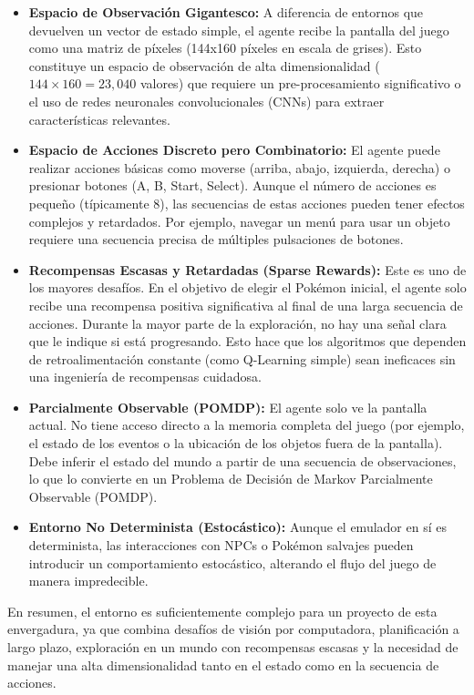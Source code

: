 \documentclass[12pt, oneside, openany]{book}
\begin{document}
\begin{itemize}
    \item \textbf{Espacio de Observación Gigantesco:} A diferencia de entornos que devuelven un vector de estado simple, el agente recibe la pantalla del juego como una matriz de píxeles (144x160 píxeles en escala de grises). Esto constituye un espacio de observación de alta dimensionalidad ($144 \times 160 = 23,040$ valores) que requiere un pre-procesamiento significativo o el uso de redes neuronales convolucionales (CNNs) para extraer características relevantes.
    \item \textbf{Espacio de Acciones Discreto pero Combinatorio:} El agente puede realizar acciones básicas como moverse (arriba, abajo, izquierda, derecha) o presionar botones (A, B, Start, Select). Aunque el número de acciones es pequeño (típicamente 8), las secuencias de estas acciones pueden tener efectos complejos y retardados. Por ejemplo, navegar un menú para usar un objeto requiere una secuencia precisa de múltiples pulsaciones de botones.
    \item \textbf{Recompensas Escasas y Retardadas (Sparse Rewards):} Este es uno de los mayores desafíos. En el objetivo de elegir el Pokémon inicial, el agente solo recibe una recompensa positiva significativa al final de una larga secuencia de acciones. Durante la mayor parte de la exploración, no hay una señal clara que le indique si está progresando. Esto hace que los algoritmos que dependen de retroalimentación constante (como Q-Learning simple) sean ineficaces sin una ingeniería de recompensas cuidadosa.
    \item \textbf{Parcialmente Observable (POMDP):} El agente solo ve la pantalla actual. No tiene acceso directo a la memoria completa del juego (por ejemplo, el estado de los eventos o la ubicación de los objetos fuera de la pantalla). Debe inferir el estado del mundo a partir de una secuencia de observaciones, lo que lo convierte en un Problema de Decisión de Markov Parcialmente Observable (POMDP).
    \item \textbf{Entorno No Determinista (Estocástico):} Aunque el emulador en sí es determinista, las interacciones con NPCs o Pokémon salvajes pueden introducir un comportamiento estocástico, alterando el flujo del juego de manera impredecible.
\end{itemize}

En resumen, el entorno es suficientemente complejo para un proyecto de esta envergadura, ya que combina desafíos de visión por computadora, planificación a largo plazo, exploración en un mundo con recompensas escasas y la necesidad de manejar una alta dimensionalidad tanto en el estado como en la secuencia de acciones.
\end{document}
